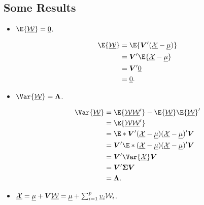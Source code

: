 \subsection*{Some Results}
\begin{itemize}
      \item $ \E{\RVector{W}}=\Vector{0} $.
            \begin{framed}
                  \begin{align*}
                        \E{\RVector{W}}
                         & =\E{\Matrix{V}'(\RVector{X}-\Vector{\mu})} \\
                         & =\Matrix{V}'\E{\RVector{X}-\Vector{\mu}}   \\
                         & =\Matrix{V}'\Vector{0}                     \\
                         & =\Vector{0}.
                  \end{align*}
            \end{framed}
      \item $ \Var{\RVector{W}}=\Matrix{\Lambda} $.
            \begin{framed}
                  \begin{align*}
                        \Var{\RVector{W}}
                         & =\E{\RVector{W}\RVector{W}'}-\E{\RVector{W}}\E{\RVector{W}}'                     \\
                         & =\E{\RVector{W}\RVector{W}'}                                                     \\
                         & =\E*{\Matrix{V}'(\RVector{X}-\Vector{\mu})(\RVector{X}-\Vector{\mu})'\Matrix{V}} \\
                         & =\Matrix{V}'\E*{(\RVector{X}-\Vector{\mu})(\RVector{X}-\Vector{\mu})'}\Matrix{V} \\
                         & =\Matrix{V}'\Var{\RVector{X}}\Matrix{V}                                          \\
                         & =\Matrix{V}'\Matrix{\Sigma}\Matrix{V}                                            \\
                         & =\Matrix{\Lambda}.
                  \end{align*}
            \end{framed}
      \item $ \underline{\mathcal{X}}=\underline{\mu}+\bm{V}\underline{\mathcal{W}}=\underline{\mu}+\sum_{i=1}^{p}\underline{v}_i \mathcal{W}_i $.
            \begin{framed}

\end{framed}
\end{itemize}
